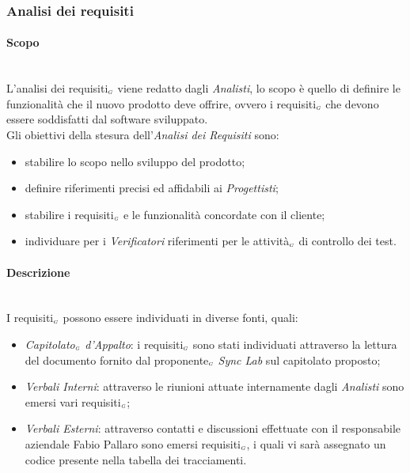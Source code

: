 \subsubsection{Analisi dei requisiti}\label{ProcessiPrimariProspettiveAnalisiDeiRequisiti}
\paragraph{Scopo}\label{ProcessiPrimariProspettiveAnalisiDeiRequisitiScopo}\mbox{}\\
L'analisi dei requisiti$_{\scaleto{G}{3pt}}$ viene redatto dagli \textit{Analisti}, lo scopo è quello di definire le funzionalità che il nuovo prodotto deve offrire, ovvero i requisiti$_{\scaleto{G}{3pt}}$ che devono essere soddisfatti dal software sviluppato.\\
Gli obiettivi della stesura dell'\textit{Analisi dei Requisiti} sono:
\begin{itemize}
	\item stabilire lo scopo nello sviluppo del prodotto;
	\item definire riferimenti precisi ed affidabili ai \textit{Progettisti};
	\item stabilire i requisiti$_{\scaleto{G}{3pt}}$ e le funzionalità concordate con il cliente;
	\item individuare per i \textit{Verificatori} riferimenti per le attività$_{\scaleto{G}{3pt}}$ di controllo dei test.
\end{itemize}
\paragraph{Descrizione}\label{ProcessiPrimariProspettiveAnalisiDeiRequisitiDescrizione}\mbox{}\\
I requisiti$_{\scaleto{G}{3pt}}$ possono essere individuati in diverse fonti, quali:
\begin{itemize}
	\item \textit{Capitolato$_{\scaleto{G}{3pt}}$ d'Appalto}: i requisiti$_{\scaleto{G}{3pt}}$ sono stati individuati attraverso la lettura del documento fornito dal proponente$_{\scaleto{G}{3pt}}$ \textit{Sync Lab} sul capitolato proposto;
	\item \textit{Verbali Interni}: attraverso le riunioni attuate internamente dagli \textit{Analisti} sono emersi vari requisiti$_{\scaleto{G}{3pt}}$;
	\item \textit{Verbali Esterni}: attraverso contatti e discussioni effettuate con il responsabile aziendale Fabio Pallaro sono emersi requisiti$_{\scaleto{G}{3pt}}$, i quali vi sarà assegnato un codice presente nella tabella dei tracciamenti.
\end{itemize}
